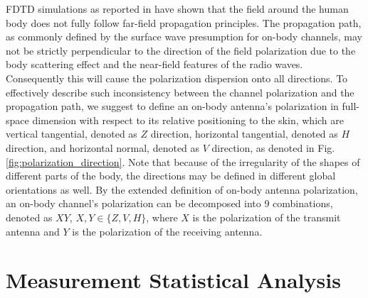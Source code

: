 \documentclass[conference]{IEEEtran}
\begin{document}
FDTD simulations as reported in \cite{} have shown that the field around the human body does not fully follow far-field propagation principles. The propagation path, as commonly defined by the surface wave presumption for on-body channels, may not be strictly perpendicular to the direction of the field polarization due to the body scattering effect and the near-field features of the radio waves. Consequently this will cause the polarization dispersion onto all directions. To effectively describe such inconsistency between the channel polarization and the propagation path, we suggest to define an on-body antenna's polarization in full-space dimension with respect to its relative positioning to the skin, which are vertical tangential, denoted as $Z$ direction, horizontal tangential, denoted as $H$ direction, and horizontal normal, denoted as $V$ direction, as denoted in Fig. \ref{fig:polarization_direction}. Note that because of the irregularity of the shapes of different parts of the body, the directions may be defined in different global orientations as well. By the extended definition of on-body antenna polarization, an on-body channel's polarization can be decomposed into 9 combinations, denoted as $XY$, $X, Y \in \{Z,V,H\}$, where $X$ is the polarization of the transmit antenna and $Y$ is the polarization of the receiving antenna.

\section{Measurement Statistical Analysis}\label{sec:analysis}

\begin{table}[!t]
\centering
\captionsetup{labelsep=newline}
\caption{Path loss summary of measurements [dB]}
\label{tab:2}
\end{table}
\end{document}
